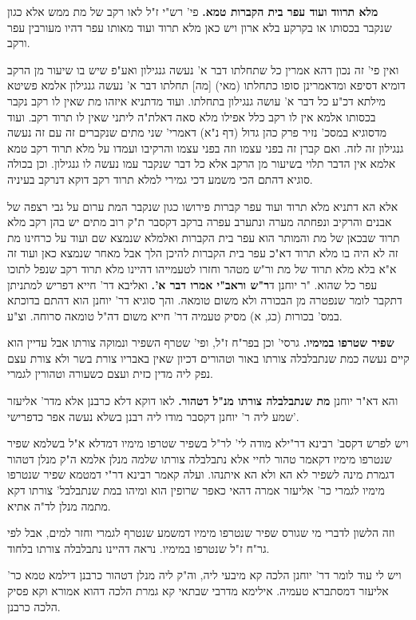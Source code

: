 \documentclass[12pt, openany]{book}
\newcommand{\sethebfont}{
\fontsize{10.5pt}{21.0pt} \selectfont
}
\newcommand{\twocol}[1]{
	{\sethebfont \begin{multicols}{2}
			#1
	\end{multicols}}	
}
\begin{document}
\twocol{\textbf{מלא תרווד ועוד עפר בית הקברות טמא.}  פי' רש"י ז"ל לאו רקב של מת ממש אלא כגון שנקבר בכסותו או בקרקע בלא ארון ויש כאן מלא תרוד ועוד מאותו עפר דהיו מעורבין עפר ורקב.\par ואין פי' זה נכון דהא אמרין כל שתחלתו דבר א' נעשה גנגילון ואע"פ שיש בו שיעור מן הרקב דומיא דסיפא ומדאמרינן סופו כתחלתו (מאי) [מה] תחלתו דבר א' נעשה גנגילון אלמא פשיטא מילתא דכ"ע כל דבר א' עושה גנגילון בתחלתו. ועוד מדתניא איזהו מת שאין לו רקב נקבר בכסותו אלמא אין לו רקב כלל אפילו מלא סאה דאלת"ה ליתני שאין לו תרוד רקב. ועוד מדסוגיא במסכ' נזיר פרק כהן גדול (דף נ"א) דאמרי' שני מתים שנקברים זה עם זה נעשה גנגילון זה לזה. ואם קברן זה בפני עצמו וזה בפני עצמו והרקיבו ועמדו על מלא תרוד רקב טמא אלמא אין הדבר תלוי בשיעור מן הרקב אלא כל דבר שנקבר עמו נעשה לו גנגילון. וכן בכולה סוגיא דהתם הכי משמע דכי גמירי למלא תרוד רקב דוקא דנרקב בעיניה.\par אלא הא דתניא מלא תרוד ועוד עפר קברות פירושו כגון שנקבר המת ערום על גבי רצפה של אבנים והרקיב ונפחתה מערה ונתערב עפרה ברקב דקסבר ת"ק רוב מתים יש בהן רקב מלא תרוד שבכאן של מת והמותר הוא עפר בית הקברות ואלמלא שנמצא שם ועוד על כרחינו מת זה לא היה בו מלא תרוד דא"כ עפר בית הקברות להיכן הלך אבל מאחר שנמצא כאן ועוד זה א"א בלא מלא תרוד של מת ור"ש מטהר וחזרו לטעמייהו דהיינו מלא תרוד רקב שנפל לתוכו עפר כל שהוא. 
\parוא"ר יוחנן ד\textbf{ר"ש וראב"י אמרו דבר א'.}  ואליבא דר' חייא דפריש למתניתן דתקבר לומר שנפטרה מן הבכורה ולא משום טומאה. והך סוגיא דר' יוחנן הוא דהתם בדוכתא במס' בכורות (כג, א) מסיק טעמיה דר' חייא משום דה"ל טומאה סרוחה. וצ"ע. 
\par\textbf{שפיר שטרפו במימיו.}  גרסי' וכן בפר"ח ז"ל, ופי' שטרף השפיר ונמוקה צורתו אבל עדיין הוא קיים נעשה כמת שנתבלבלה צורתו באור וטהורים דכיון שאין באבריו צורת בשר ולא צורת עצם נפק ליה מדין כזית ועצם כשעורה וטהורין לגמרי. 
\par והא דא"ר יוחנן \textbf{מת שנתבלבלה צורתו מנ"ל דטהור.}  לאו דוקא דלא כרבנן אלא מדר' אליעזר שמע ליה ר' יוחנן דקסבר מודו ליה רבנן בשלא נעשה אפר כדפרישי'.\par  ויש לפרש דקסב' רבינא דר"ילא מודה לי' לר"ל בשפיר שטרפו מימיו דמדלא א"ל בשלמא שפיר שנטרפו מימיו דקאמר טהור לחיי אלא נתבלבלה צורתו שלמה מנלן אלמא ה"ק מנלן דטהור דגמרת מינה לשפיר לא הא ולא הא איתנהו. ועלה קאמר רבינא דר"י דמטמא שפיר שנטרפו מימיו לגמרי כר' אליעזר אמרה דהאי כאפר שרופין הוא ומיהו במת שנתבלבל' צורתו דקא מתמה מנלן לד"ה אתיא.\par וזה הלשון לדברי מי שגורס שפיר שנטרפו מימיו דמשמע שנטרף לגמרי וחזר למים, אבל לפי גר"ח ז"ל שנטרפו במימיו. נראה דהיינו נתבלבלה צורתו בלחוד.\par ויש לי עוד לומר דר' יוחנן הלכה קא מיבעי ליה, וה"ק ליה מנלן דטהור כרבנן דילמא טמא כר' אליעזר דמסתברא טעמיה. אילימא מדרבי שבתאי קא גמרת הלכה דהוא אמורא וקא פסיק הלכה כרבנן. 
\par}
\end{document}
